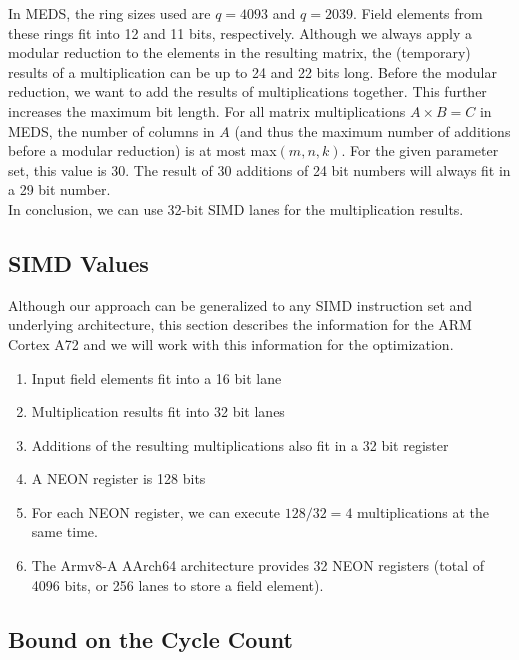 \documentclass[a4paper]{article}
\begin{document}
In MEDS, the ring sizes used are $q = 4093$ and $q = 2039$. Field elements from these rings fit into 12 and 11 bits, respectively. Although we always apply a modular reduction to the elements in the resulting matrix, the (temporary) results of a multiplication can be up to 24 and 22 bits long. Before the modular reduction, we want to add the results of multiplications together. This further increases the maximum bit length. For all matrix multiplications $A \times B = C$ in MEDS, the number of columns in $A$ (and thus the maximum number of additions before a modular reduction) is at most max$(m, n, k)$. For the given parameter set, this value is 30. The result of 30 additions of 24 bit numbers will always fit in a 29 bit number.\\
In conclusion, we can use 32-bit SIMD lanes for the multiplication results.

\subsection{SIMD Values}
Although our approach can be generalized to any SIMD instruction set and underlying architecture, this section describes the information for the ARM Cortex A72 and we will work with this information for the optimization.

\begin{enumerate}
    \item Input field elements fit into a 16 bit lane
    \item Multiplication results fit into 32 bit lanes
    \item Additions of the resulting multiplications also fit in a 32 bit register
    \item A NEON register is 128 bits
    \item For each NEON register, we can execute $128 / 32 = 4$ multiplications at the same time.
    \item The Armv8-A AArch64 architecture provides 32 NEON registers (total of 4096 bits, or 256 lanes to store a field element).
\end{enumerate}

\subsection{Bound on the Cycle Count}
\end{document}
